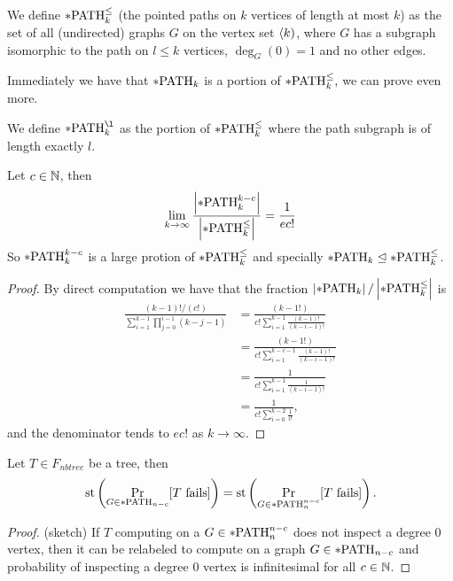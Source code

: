 \begin{defi}
We define $*\text{PATH}^\leq_k$ (the pointed paths on $k$ vertices of length at most $k$) as the set of all (undirected) graphs $G$ on the vertex set $\langle k)$, where $G$ has a subgraph isomorphic to the path on $l\leq k$ vertices, $\deg_G(0)=1$ and no other edges.
\end{defi}

Immediately we have that $*\text{PATH}_k$ is a portion of $*\text{PATH}^\leq_k,$ we can prove even more.

\begin{defi}
We define $\pPATH_k^{\l}$ as the portion of $*\text{PATH}^\leq_k$ where the path subgraph is of length exactly $l$. 
\end{defi}


\begin{lemm}
Let $c\in \mathbb{N}$, then 
\[\lim_{k\to\infty}\frac{\left|{*\text{PATH}_k^{k-c}}\right|}{\left|{*\text{PATH}^\leq_k}\right|}=\frac{1}{ec!}\]
So $*\text{PATH}_k^{k-c}$ is a large protion of $*\text{PATH}^\leq_k$ and specially $*\text{PATH}_k\trianglelefteq *\text{PATH}^\leq_k$.
\end{lemm}
\begin{proof}
By direct computation we have that the fraction $\left|{*\text{PATH}_k}\right|/\left|{*\text{PATH}^\leq_k}\right|$ is
\begin{align}
\frac{(k-1)!/(c!)}{\sum_{i=1}^{k-1}\prod_{j=0}^{i-1}(k-j-1)}&=\frac{(k-1!)}{c!\sum_{i=1}^{k-1}\frac{(k-1)!}{(k-i-1)!}}\\
&=\frac{(k-1!)}{c!\sum_{i=1}^{k-c-1}\frac{(k-1)!}{(k-i-1)!}}\\
&=\frac{1}{c!\sum_{i=1}^{k-1}\frac{1}{(k-i-1)!}}\\
&=\frac{1}{c!\sum_{i=0}^{k-2}\frac{1}{i!}},
\end{align}
and the denominator tends to $ec!$ as $k\to\infty$.
\end{proof}

\begin{lemm}\label{lemmpathnnc}
Let $T\in F_{nbtree}$ be a tree, then
\[\text{st}\left(\Pr_{G\in*\text{PATH}_{n-c}}[\text{$T$ fails}]\right )=\text{st}\left(\Pr_{G\in*\text{PATH}_{n}^{n-c}}[\text{$T$ fails}]\right).\]
\end{lemm}
\begin{proof}(sketch)
If $T$ computing on a $G\in*\text{PATH}_n^{n-c}$ does not inspect a degree 0 vertex, then it can be relabeled to compute on a graph $G\in*\text{PATH}_{n-c}$ and probability of inspecting a degree 0 vertex is infinitesimal for all $c\in \mathbb{N}$.
\end{proof}


